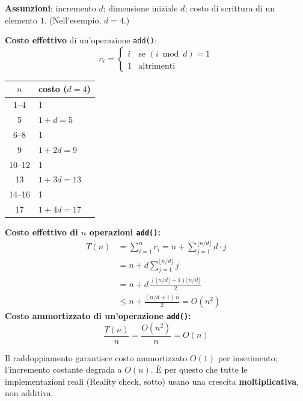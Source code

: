 \documentclass[12pt, a4paper]{article}
\begin{document}
\begin{tcolorbox}[colback=lightergray!10, colframe=tocsec, title=\textbf{Analisi Ammortizzata: Incremento Costante del Vettore}]
\label{prop:incremento-vettore}
\textbf{Assunzioni}: incremento $d$; dimensione iniziale $d$; costo di scrittura di un elemento $1$. (Nell'esempio, $d=4$.)

\textbf{Costo effettivo} di un'operazione \texttt{add()}:
$$c_i = \begin{cases} i & \text{se } (i \bmod d) = 1 \\ 1 & \text{altrimenti} \end{cases}$$
\end{tcolorbox}

\begin{center}
\begin{tabular}{cl}
\toprule
$n$ & \textbf{costo} ($d=4$) \\
\midrule
1--4 & 1 \\
5 & $1+d=5$ \\
6--8 & 1 \\
9 & $1+2d=9$ \\
10--12 & 1 \\
13 & $1+3d=13$ \\
14--16 & 1 \\
17 & $1+4d=17$ \\
\bottomrule
\end{tabular}
\end{center}

\textbf{Costo effettivo di $n$ operazioni \texttt{add()}:}
\begin{align*}
T(n) &= \sum_{i=1}^n c_i = n + \sum_{j=1}^{\lfloor n/d \rfloor} d\cdot j \\
     &= n + d\sum_{j=1}^{\lfloor n/d \rfloor} j \\
     &= n + d\,\frac{(\lfloor n/d \rfloor + 1)\lfloor n/d \rfloor}{2} \\
     &\le n + \frac{(n/d+1)\,n}{2} = O(n^2)
\end{align*}
\textbf{Costo ammortizzato di un'operazione \texttt{add()}:}
$$\frac{T(n)}{n} = \frac{O(n^2)}{n} = O(n)$$

\begin{tcolorbox}[colback=lightergray!5, colframe=tocsubsec, title=\textbf{Confronto}]
Il raddoppiamento garantisce costo ammortizzato $O(1)$ per inserimento; l'incremento costante degrada a $O(n)$. È per questo che tutte le implementazioni reali (Reality check, sotto) usano una crescita \textbf{moltiplicativa}, non additiva.
\end{tcolorbox}
\end{document}
